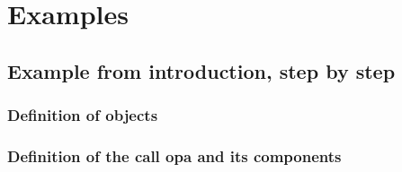 \documentclass[a4paper,11pt]{report}
\newcommand{\inputTikZ}[1]{%
  }%
\newcommand{\inputTikZ}[1]{%
    \texttt{[image: fig/\#1.pdf]}%
  }%
\begin{document}
\section{Examples}

\subsection{Example from introduction, step by step}

\subsubsection{Definition of objects}

{\color{red!70!black}
\vspace{-0.4cm}

}

\begin{center}
\inputTikZ{seqdiagstep1}
\end{center}

\subsubsection{Definition of the call opa and its components}

\vspace{-0.4cm}
{\color{red!70!black}
\vspace{-0.4cm}
\vspace{-0.4cm}
\vspace{-0.4cm}
\vspace{-0.4cm}
\vspace{-0.4cm}
\vspace{-0.4cm}
\vspace{-0.4cm}
\vspace{-0.4cm}
\vspace{-0.4cm}
}

\end{document}

